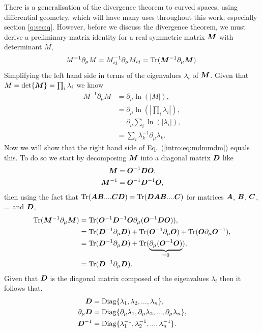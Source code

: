 There is a generalisation of the divergence theorem to curved spaces, using differential geometry, which will have many uses throughout this work; especially section \ref{q:sec:q}. However, before we discuss the divergence theorem, we must derive a preliminary matrix identity for a real symmetric matrix $\boldsymbol{M}$ with determinant $M$,
\begin{equation}\label{intro:eq:mdmmdm}
M^{-1} \partial_\mu M = M^{-1}_{ij} \partial_\mu M_{ij} = \mathrm{Tr}(\boldsymbol{M}^{-1} \partial_\mu \boldsymbol{M}).
\end{equation}
Simplifying the left hand side in terms of the eigenvalues $\lambda_i$ of $\boldsymbol{M}$. Given that $M=\det{\boldsymbol{M}}=\prod_i \lambda_i$ we know
\begin{align}
M^{-1} \partial_\mu M &= \partial_\mu \ln(|M|) ,\\
&= \partial_\mu \ln\left(\left| \prod_i \lambda_i\right|\right) ,\\
&= \partial_\mu \sum_i \ln(\left|  \lambda_i\right|) ,\\
&= \sum_i \lambda_k^{-1}\partial_\mu \lambda_k. 
\end{align}
Now we will show that the right hand side of Eq.~(\ref{intro:eq:mdmmdm}) equals this. To do so we start by decomposing $\boldsymbol{M}$ into a diagonal matrix $\boldsymbol{D}$ like
\begin{align}
\boldsymbol{M} &= \boldsymbol{O}^{-1} \boldsymbol{D} \boldsymbol{O},\\
\boldsymbol{M}^{-1} &= \boldsymbol{O}^{-1} \boldsymbol{D}^{-1} \boldsymbol{O},
\end{align}
then using the fact that $\mathrm{Tr}(\boldsymbol{A} \boldsymbol{B} .... \boldsymbol{C}\boldsymbol{D}) = \mathrm{Tr}(\boldsymbol{D}\boldsymbol{A} \boldsymbol{B} .... \boldsymbol{C})$ for matrices $\boldsymbol{A}$, $ \boldsymbol{B}$, $ \boldsymbol{C}$, $...$ and $\boldsymbol{D}$,
\begin{align}
\mathrm{Tr}(\boldsymbol{M}^{-1} \partial_\mu \boldsymbol{M}) &= \mathrm{Tr}(\boldsymbol{O}^{-1} \boldsymbol{D}^{-1} \boldsymbol{O} \partial_\mu (\boldsymbol{O}^{-1} \boldsymbol{D} \boldsymbol{O})) ,\\
&= \mathrm{Tr}(\boldsymbol{D}^{-1} \partial_\mu \boldsymbol{D}) + \mathrm{Tr}(\boldsymbol{O}^{-1} \partial_\mu \boldsymbol{O}) +\mathrm{Tr}(\boldsymbol{O} \partial_\mu \boldsymbol{O}^{-1}) , \\
&= \mathrm{Tr}(\boldsymbol{D}^{-1} \partial_\mu \boldsymbol{D}) + \mathrm{Tr}( \underbrace{\partial_\mu (\boldsymbol{O}^{-1}\boldsymbol{O})}_{=0}) , \\
&= \mathrm{Tr}(\boldsymbol{D}^{-1} \partial_\mu \boldsymbol{D}) .
\end{align}
Given that $\boldsymbol{D}$ is the diagonal matrix composed of the eigenvalues $\lambda_i$ then it follows that,
\begin{align}
\boldsymbol{D} &= \mathrm{Diag}\{\lambda_1,\lambda_2,...,\lambda_n\} ,\\
\partial_\mu\boldsymbol{D} &= \mathrm{Diag}\{\partial_\mu\lambda_1,\partial_\mu\lambda_2,...,\partial_\mu\lambda_n\} ,\\
\boldsymbol{D}^{-1} &= \mathrm{Diag}\{\lambda^{-1}_1,\lambda^{-1}_2,...,\lambda^{-1}_n\} .
\end{align}
